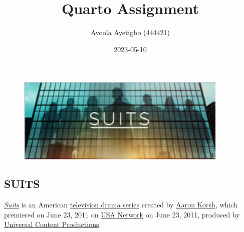 \documentclass[
  letterpaper,
  DIV=11,
  numbers=noendperiod]{scrartcl}
\title{Quarto Assignment}
\author{Ayoola Ayetigbo (444421)}
\date{2023-05-10}
\begin{document}
\maketitle
\ifdefined\Shaded\renewenvironment{Shaded}{\begin{tcolorbox}[enhanced, frame hidden, interior hidden, boxrule=0pt, breakable, sharp corners, borderline west={3pt}{0pt}{shadecolor}]}{\end{tcolorbox}}\fi

\begin{figure}

{\centering \includegraphics[width=0.9\textwidth,height=\textheight]{title card.png}

}

\end{figure}

\hypertarget{suits}{%
\subsection{SUITS}\label{suits}}

\href{https://en.wikipedia.org/wiki/Suits_(American_TV_series)}{\emph{Suits}}
is an American
\href{https://en.wikipedia.org/wiki/Television_drama_series}{television
drama series} created by
\href{https://en.wikipedia.org/wiki/Aaron_Korsh}{Aaron Korsh}, which
premiered on June 23, 2011 on
\href{https://en.wikipedia.org/wiki/USA_Network}{USA Network} on June
23, 2011, produced by
\href{https://en.wikipedia.org/wiki/Universal_Content_Productions}{Universal
Content Productions}.
\end{document}
